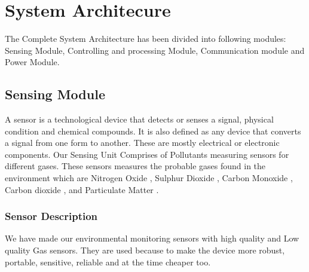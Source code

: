 \chapter{System Architecure} %

\label{Chapter3} %

The Complete System Architecture has been divided into following modules: Sensing Module, Controlling and processing Module, Communication module and Power Module.

\section{Sensing Module}
A sensor is a technological device that detects or senses a signal, physical condition and chemical compounds. It is also defined as any device that converts a signal from one form to another. These are mostly electrical or electronic components. Our Sensing Unit Comprises of Pollutants measuring sensors for different gases. These sensors measures the probable gases found in the environment which are Nitrogen Oxide , Sulphur Dioxide , Carbon Monoxide , Carbon dioxide , and Particulate Matter .

\subsection{Sensor Description}
We have made our environmental monitoring sensors with high quality and Low quality Gas sensors. They are used because to make the device more robust, portable, sensitive, reliable and at the time cheaper too.

